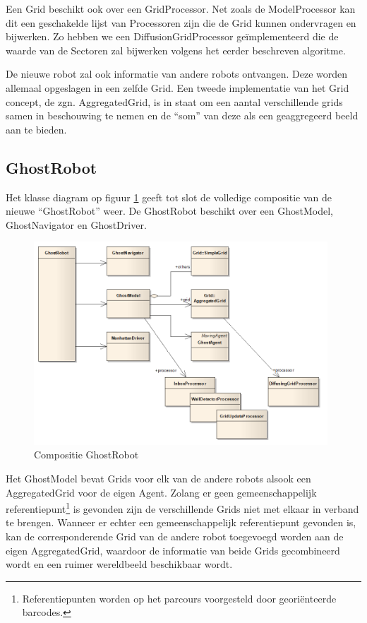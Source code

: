 \documentclass[12pt,a4paper]{report}
\begin{document}
Een Grid beschikt ook over een GridProcessor. Net zoals de ModelProcessor kan dit een geschakelde lijst van Processoren zijn die de Grid kunnen ondervragen en bijwerken. Zo hebben we een DiffusionGridProcessor ge\"implementeerd die de waarde van de Sectoren zal bijwerken volgens het eerder beschreven algoritme.

De nieuwe robot zal ook informatie van andere robots ontvangen. Deze worden allemaal opgeslagen in een zelfde Grid. Een tweede implementatie van het Grid concept, de zgn. AggregatedGrid, is in staat om een aantal verschillende grids samen in beschouwing te nemen en de ``som'' van deze als een geaggregeerd beeld aan te bieden.

\subsection{GhostRobot}

Het klasse diagram op figuur \ref{uml:ghostrobot} geeft tot slot de volledige compositie van de nieuwe ``GhostRobot'' weer. De GhostRobot beschikt over een GhostModel, GhostNavigator en GhostDriver.

\begin{figure}[htbp]
  \centering
  \includegraphics[width=110mm]{resources/ghostrobot.png}
  \caption{Compositie GhostRobot}
  \label{uml:ghostrobot}
\end{figure}

Het GhostModel bevat Grids voor elk van de andere robots alsook een AggregatedGrid voor de eigen Agent. Zolang er geen gemeenschappelijk referentiepunt\footnote{Referentiepunten worden op het parcours voorgesteld door geori\"enteerde barcodes.} is gevonden zijn de verschillende Grids niet met elkaar in verband te brengen. Wanneer er echter een gemeenschappelijk referentiepunt gevonden is, kan de corresponderende Grid van de andere robot toegevoegd worden aan de eigen AggregatedGrid, waardoor de informatie van beide Grids gecombineerd wordt en een ruimer wereldbeeld beschikbaar wordt.
\end{document}

